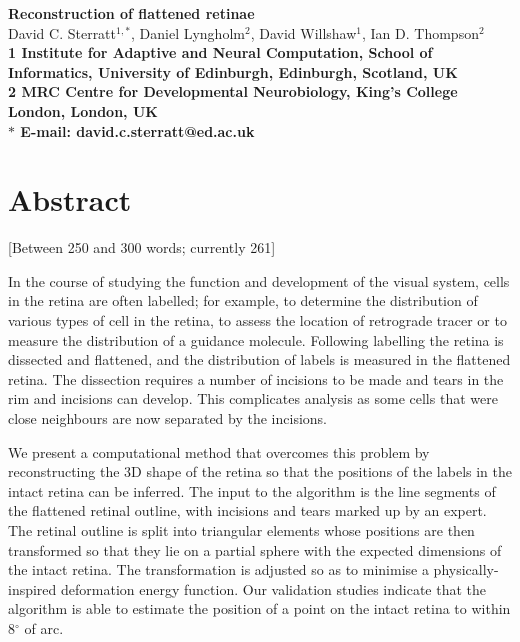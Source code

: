 \documentclass[10pt]{article}
\date{}
\newcommand{\todo}[1]{{\color{red}[#1]}}
\begin{document}
\begin{flushleft}
{\Large
\textbf{Reconstruction of flattened retinae}
}
\\
David C. Sterratt$^{1,\ast}$, Daniel Lyngholm$^{2}$, David
Willshaw$^{1}$, Ian D. Thompson$^{2}$
\\
\bf{1} Institute for Adaptive and Neural Computation, School of
Informatics, University of Edinburgh, Edinburgh, Scotland, UK
\\
\bf{2} MRC Centre for Developmental Neurobiology, King's College
London, London, UK
\\
$\ast$ E-mail: david.c.sterratt@ed.ac.uk
\end{flushleft}

\section*{Abstract}

\todo{Between 250 and 300 words; currently 261}

In the course of studying the function and development of the visual
system, cells in the retina are often labelled; for example, to
determine the distribution of various types of cell in the retina, to
assess the location of retrograde tracer or to measure the
distribution of a guidance molecule.  Following labelling the retina
is dissected and flattened, and the distribution of labels is measured
in the flattened retina.  The dissection requires a number of
incisions to be made and tears in the rim and incisions can
develop. This complicates analysis as some cells that were close
neighbours are now separated by the incisions.

We present a computational method that overcomes this problem by
reconstructing the 3D shape of the retina so that the positions of the
labels in the intact retina can be inferred. The input to the
algorithm is the line segments of the flattened retinal outline, with
incisions and tears marked up by an expert. The retinal outline is
split into triangular elements whose positions are then transformed so
that they lie on a partial sphere with the expected dimensions of the
intact retina.  The transformation is adjusted so as to minimise a
physically-inspired deformation energy function. Our validation
studies indicate that the algorithm is able to estimate the position
of a point on the intact retina to within 8$^\circ$ of arc.
\end{document}
